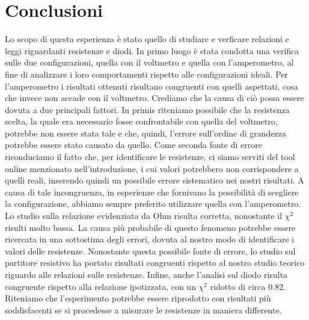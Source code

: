 \section{Conclusioni}
Lo scopo di questa esperienza è stato quello di studiare e verficare relazioni e leggi riguardanti resistenze e diodi. In primo luogo è stata condotta una verifica sulle due configurazioni, quella con il voltmetro e quella con l'amperometro, al fine di analizzare i loro comportamenti rispetto alle configurazioni ideali. Per l'amperometro i risultati ottenuti risultano congruenti con quelli aspettati, cosa che invece non accade con il voltmetro. Crediamo che la causa di ciò possa essere dovuta a due principali fattori. In primis riteniamo possibile che la resistenza scelta, la quale era necessario fosse confrontabile con quella del voltmetro, potrebbe non essere stata tale e che, quindi, l'errore sull'ordine di grandezza potrebbe essere stato causato da quello. Come seconda fonte di errore riconduciamo il fatto che, per identificare le resistenze, ci siamo serviti del tool online menzionato nell'introduzione, i cui valori potrebbero non corrispondere a quelli reali, inserendo quindi un possibile errore sistematico nei nostri risultati. A causa di tale incongruenza, in esperienze che fornivano la possibilità di scegliere la configurazione, abbiamo sempre preferito utilizzare quella con l'amperometro. Lo studio sulla relazione evidenziata da Ohm risulta corretta, nonostante il $\chi^2$ risulti molto bassa. La causa più probabile di questo fenomeno potrebbe essere ricercata in una sottostima degli errori, dovuta al nostro modo di identificare i valori delle resistenze. Nonostante questa possibile fonte di errore, lo studio sul partitore resistivo ha portato risultati congruenti rispetto al nostro studio teorico riguardo alle relazioni sulle resistenze. Infine, anche l'analisi sul diodo risulta congruente rispetto alla relazione ipotizzata, con un $\chi^2$ ridotto di circa 0.82. Riteniamo che l'esperimento potrebbe essere riprodotto con risultati più soddisfacenti se si procedesse a misurare le resistenze in maniera differente. 